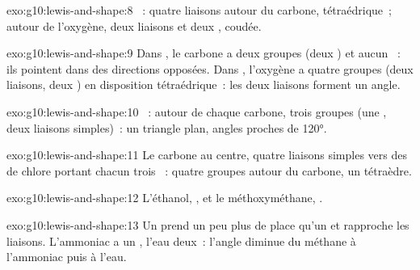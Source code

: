 \begin{solution}{exo:g10:lewis-and-shape:8}
~: quatre liaisons
autour du carbone, tétraédrique~; autour de l'oxygène, deux liaisons et
deux , coudée.
\end{solution}

\begin{solution}{exo:g10:lewis-and-shape:9}
Dans , le carbone a deux groupes (deux ) et aucun
~: ils pointent dans des directions opposées. Dans
, l'oxygène a quatre groupes (deux liaisons, deux ) en disposition tétraédrique~: les deux liaisons forment un angle.
\end{solution}

\begin{solution}{exo:g10:lewis-and-shape:10}
~: autour de chaque carbone,
trois groupes (une , deux liaisons simples)~: un triangle
plan, angles proches de \ang{120}.
\end{solution}

\begin{solution}{exo:g10:lewis-and-shape:11}
Le carbone au centre, quatre liaisons simples vers des  de chlore
portant chacun trois ~: quatre groupes autour du
carbone, un tétraèdre.
\end{solution}

\begin{solution}{exo:g10:lewis-and-shape:12}
L'éthanol, , et
le méthoxyméthane,
.
\end{solution}

\begin{solution}{exo:g10:lewis-and-shape:13}
Un  prend un peu plus de place qu'un  et
rapproche les liaisons. L'ammoniac a un , l'eau deux~:
l'angle diminue du méthane à l'ammoniac puis à l'eau.
\end{solution}

